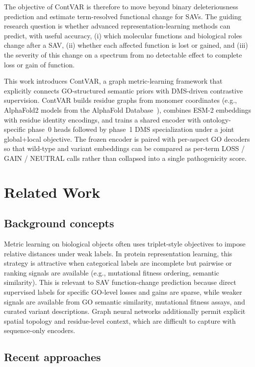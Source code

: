 \documentclass[11pt,a4paper]{article}
\begin{document}
The objective of ContVAR is therefore to move beyond binary deleteriousness prediction and estimate term-resolved functional change for SAVs. The guiding research question is whether advanced representation-learning methods can predict, with useful accuracy, (i) which molecular functions and biological roles change after a SAV, (ii) whether each affected function is lost or gained, and (iii) the severity of this change on a spectrum from no detectable effect to complete loss or gain of function.

This work introduces ContVAR, a graph metric-learning framework that explicitly connects GO-structured semantic priors with DMS-driven contrastive supervision. ContVAR builds residue graphs from monomer coordinates (e.g., AlphaFold2 models from the AlphaFold Database~\cite{jumper2021highly,varadi2022afdb}), combines ESM-2 embeddings with residue identity encodings, and trains a shared encoder with ontology-specific phase~0 heads followed by phase~1 DMS specialization under a joint global+local objective. The frozen encoder is paired with per-aspect GO decoders so that wild-type and variant embeddings can be compared as per-term LOSS / GAIN / NEUTRAL calls rather than collapsed into a single pathogenicity score.

\section{Related Work}

\subsection{Background concepts}
Metric learning on biological objects often uses triplet-style objectives to impose relative distances under weak labels. In protein representation learning, this strategy is attractive when categorical labels are incomplete but pairwise or ranking signals are available (e.g., mutational fitness ordering, semantic similarity). This is relevant to SAV function-change prediction because direct supervised labels for specific GO-level losses and gains are sparse, while weaker signals are available from GO semantic similarity, mutational fitness assays, and curated variant descriptions. Graph neural networks additionally permit explicit spatial topology and residue-level context, which are difficult to capture with sequence-only encoders.

\subsection{Recent approaches}
\end{document}
